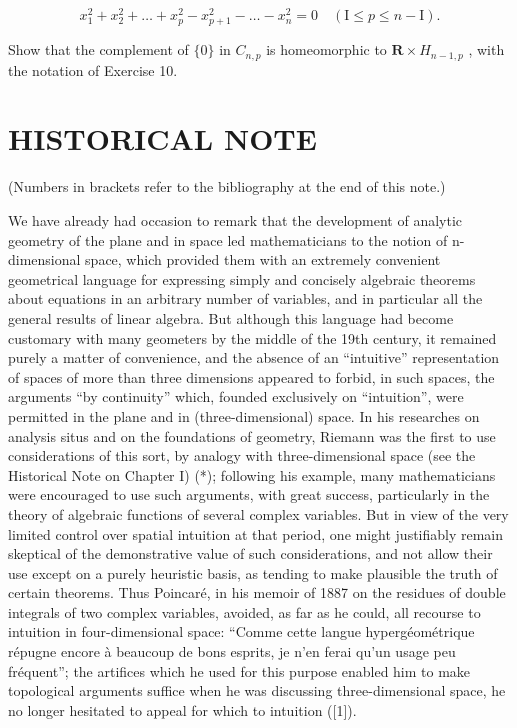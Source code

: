\[
x _ {1} ^ {2} + x _ {2} ^ {2} + \dots + x _ {p} ^ {2} - x _ {p + 1} ^ {2} - \dots - x _ {n} ^ {2} = 0 \quad (\mathrm{I} \leqslant p \leqslant n - \mathrm{I}).
\]

Show that the complement of \(\{0\}\) in \(C_{n,p}\) is homeomorphic to \(\mathbf{R} \times H_{n-1,p}\) , with the notation of Exercise 10.

\section*{HISTORICAL NOTE}
{}

(Numbers in brackets refer to the bibliography at the end of this note.)

We have already had occasion to remark that the development of analytic geometry of the plane and in space led mathematicians to the notion of n-dimensional space, which provided them with an extremely convenient geometrical language for expressing simply and concisely algebraic theorems about equations in an arbitrary number of variables, and in particular all the general results of linear algebra. But although this language had become customary with many geometers by the middle of the 19th century, it remained purely a matter of convenience, and the absence of an ``intuitive'' representation of spaces of more than three dimensions appeared to forbid, in such spaces, the arguments ``by continuity'' which, founded exclusively on ``intuition'', were permitted in the plane and in (three-dimensional) space. In his researches on analysis situs and on the foundations of geometry, Riemann was the first to use considerations of this sort, by analogy with three-dimensional space (see the Historical Note on Chapter I) (*); following his example, many mathematicians were encouraged to use such arguments, with great success, particularly in the theory of algebraic functions of several complex variables. But in view of the very limited control over spatial intuition at that period, one might justifiably remain skeptical of the demonstrative value of such considerations, and not allow their use except on a purely heuristic basis, as tending to make plausible the truth of certain theorems. Thus Poincaré, in his memoir of 1887 on the residues of double integrals of two complex variables, avoided, as far as he could, all recourse to intuition in four-dimensional space: ``Comme cette langue hypergéométrique répugne encore à beaucoup de bons esprits, je n'en ferai qu'un usage peu fréquent''; the artifices which he used for this purpose enabled him to make topological arguments suffice when he was discussing three-dimensional space, he no longer hesitated to appeal for which to intuition ({[}1{]}).

